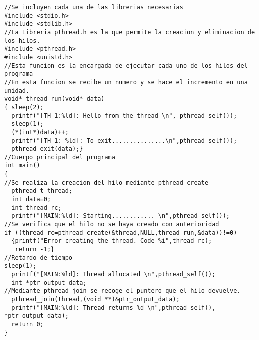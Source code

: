 \documentclass[11pt,letterpaper]{article}
\begin{document}
\begin{lstlisting}
//Se incluyen cada una de las librerias necesarias
#include <stdio.h>
#include <stdlib.h>
//La Libreria pthread.h es la que permite la creacion y eliminacion de los hilos. 
#include <pthread.h>
#include <unistd.h>
//Esta funcion es la encargada de ejecutar cada uno de los hilos del programa
//En esta funcion se recibe un numero y se hace el incremento en una unidad.
void* thread_run(void* data)
{ sleep(2); 
  printf("[TH_1:%ld]: Hello from the thread \n", pthread_self());
  sleep(1);
  (*(int*)data)++;
  printf("[TH_1: %ld]: To exit...............\n",pthread_self());
  pthread_exit(data);}
//Cuerpo principal del programa
int main()
{
//Se realiza la creacion del hilo mediante pthread_create
  pthread_t thread;
  int data=0;
  int thread_rc;
  printf("[MAIN:%ld]: Starting............ \n",pthread_self());
//Se verifica que el hilo no se haya creado con anterioridad
if ((thread_rc=pthread_create(&thread,NULL,thread_run,&data))!=0)
  {printf("Error creating the thread. Code %i",thread_rc);
   return -1;}
//Retardo de tiempo
sleep(1);
  printf("[MAIN:%ld]: Thread allocated \n",pthread_self());
  int *ptr_output_data;
//Mediante pthread_join se recoge el puntero que el hilo devuelve.
  pthread_join(thread,(void **)&ptr_output_data);
  printf("[MAIN:%ld]: Thread returns %d \n",pthread_self(), *ptr_output_data);
  return 0;
}

\end{lstlisting}












\end{document}

